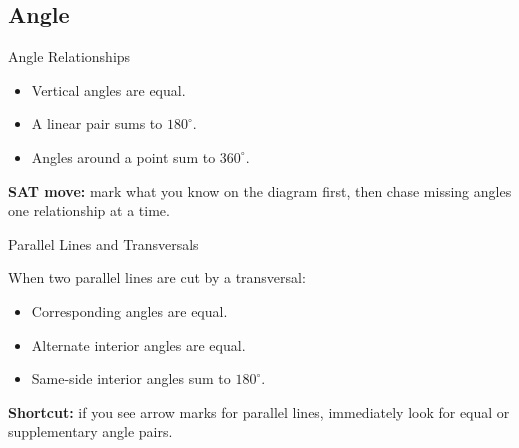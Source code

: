 \documentclass{beamer}
\begin{document}
\begin{frame}
\section{Angle}
\end{frame}


\begin{frame}{Angle Relationships}

\begin{itemize}
    \item Vertical angles are equal.
    \item A linear pair sums to $180^\circ$.
    \item Angles around a point sum to $360^\circ$.
\end{itemize}

\vspace{0.2cm}
\textbf{SAT move:} mark what you know on the diagram first, then chase missing angles one relationship at a time.

\end{frame}

\begin{frame}{Parallel Lines and Transversals}

When two parallel lines are cut by a transversal:
\begin{itemize}
    \item Corresponding angles are equal.
    \item Alternate interior angles are equal.
    \item Same-side interior angles sum to $180^\circ$.
\end{itemize}

\vspace{0.2cm}
\textbf{Shortcut:} if you see arrow marks for parallel lines, immediately look for equal or supplementary angle pairs.

\end{frame}
\end{document}
